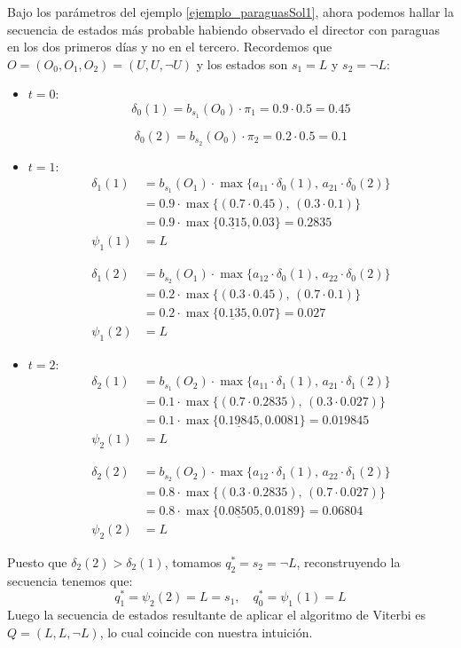 \begin{exampleth}
Bajo los parámetros del ejemplo \ref{ejemplo_paraguasSol1}, ahora podemos hallar la secuencia de estados más probable habiendo observado el director con paraguas en los dos primeros días y no en el tercero. Recordemos que $O=(O_0,O_1,O_2)=(U,U,\neg U)$ y los estados son $s_1=L$ y $s_2=\neg L$:
\begin{itemize}
    \item $t=0$:
    \[\delta_0(1)=b_{s_1}(O_0)\cdot\pi_1=0.9\cdot0.5=0.45\]
    
    \[\delta_0(2)=b_{s_2}(O_0)\cdot\pi_2=0.2\cdot0.5=0.1\]
    
    \item $t=1$:
    \[\begin{aligned}
        \delta_1(1)&=b_{s_1}(O_1)\cdot\max\{a_{11}\cdot\delta_0(1),\,a_{21}\cdot\delta_0(2)\}\\
        &=0.9\cdot\max\{(0.7\cdot0.45),\,(0.3\cdot0.1)\}\\
        &=0.9\cdot\max\{\underline{0.315},0.03\}=0.2835\\
        \psi_1(1)&=L
    \end{aligned}\]
    
    \[\begin{aligned}
        \delta_1(2)&=b_{s_2}(O_1)\cdot\max\{a_{12}\cdot\delta_0(1),\,a_{22}\cdot\delta_0(2)\}\\
        &=0.2\cdot\max\{(0.3\cdot0.45),\,(0.7\cdot0.1)\}\\
        &=0.2\cdot\max\{\underline{0.135},0.07\}=0.027\\
        \psi_1(2)&=L
    \end{aligned}\]
    
    \item $t=2$:
    \[\begin{aligned}
        \delta_2(1)&=b_{s_1}(O_2)\cdot\max\{a_{11}\cdot\delta_1(1),\,a_{21}\cdot\delta_1(2)\}\\
        &=0.1\cdot\max\{(0.7\cdot0.2835),\,(0.3\cdot0.027)\}\\
        &=0.1\cdot\max\{\underline{0.19845},0.0081\}=0.019845\\
        \psi_2(1)&=L
    \end{aligned}\]
    
    \[\begin{aligned}
        \delta_2(2)&=b_{s_2}(O_2)\cdot\max\{a_{12}\cdot\delta_1(1),\,a_{22}\cdot\delta_1(2)\}\\
        &=0.8\cdot\max\{(0.3\cdot0.2835),\,(0.7\cdot0.027)\}\\
        &=0.8\cdot\max\{\underline{0.08505},0.0189\}=0.06804\\
        \psi_2(2)&=L
    \end{aligned}\]
\end{itemize}
Puesto que $\delta_2(2)>\delta_2(1)$, tomamos $q_2^*=s_2=\neg L$, reconstruyendo la secuencia tenemos que:
\[q_1^*=\psi_2(2)=L=s_1, \quad q_0^*=\psi_1(1)=L\]
Luego la secuencia de estados resultante de aplicar el algoritmo de Viterbi es $Q=(L,L,\neg L)$, lo cual coincide con nuestra intuición.

\end{exampleth}


